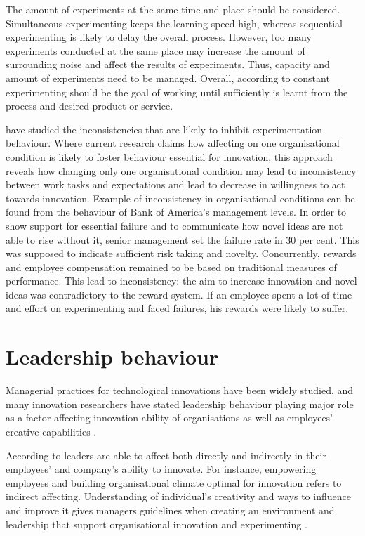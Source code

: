 The amount of experiments at the same time and place should be considered. Simultaneous experimenting keeps the learning speed high, whereas sequential experimenting is likely to delay the overall process. However, too many experiments conducted at the same place may increase the amount of surrounding noise and affect the results of experiments. Thus, capacity and amount of experiments need to be managed. \citep{thomke2003r} Overall, according to \citet{amabile2008creativity} constant experimenting should be the goal of working until sufficiently is learnt from the process and desired product or service. 

\citet{lee2004mixed} have studied the inconsistencies that are likely to inhibit experimentation behaviour. Where current research claims how affecting on one organisational condition is likely to foster behaviour essential for innovation, this approach reveals how changing only one organisational condition may lead to inconsistency between work tasks and expectations and lead to decrease in willingness to act towards innovation. Example of inconsistency in organisational conditions can be found from the behaviour of Bank of America's management levels. In order to show support for essential failure and to communicate how novel ideas are not able to rise without it, senior management set the failure rate in 30 per cent. This was supposed to indicate sufficient risk taking and novelty. Concurrently, rewards and employee compensation remained to be based on traditional measures of performance. This lead to inconsistency: the aim to increase innovation and novel ideas was contradictory to the reward system. If an employee spent a lot of time and effort on experimenting and faced failures, his rewards were likely to suffer. \citep{lee2004mixed} 

\section{Leadership behaviour}
Managerial practices for technological innovations have been widely studied, and many innovation researchers have stated leadership behaviour playing major role as a factor affecting innovation ability of organisations \citep{buijs2007innovation,jung2003role,jung2001transformational,amabile1998kill,mumford1988creativity} as well as employees' creative capabilities \citep{mumford2002leading,jung2001transformational,amabile1998kill,hennessey19881}. 

According to \citet{jung2003role} leaders are able to affect both directly and indirectly in their employees' and company's ability to innovate. For instance, empowering employees and building organisational climate optimal for innovation refers to indirect affecting. Understanding of individual's creativity and ways to influence and improve it gives managers guidelines when creating an environment and leadership that support organisational innovation and experimenting \citep{redmond1993putting}. 

